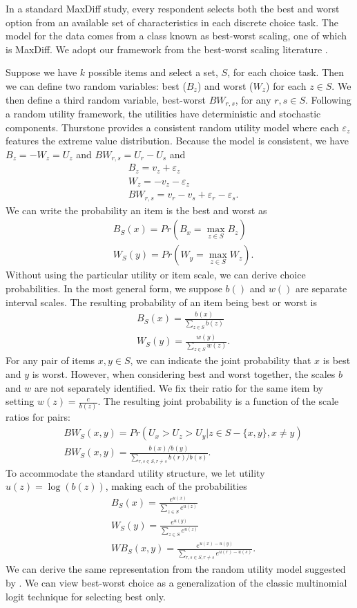 \documentclass[a4paper,11pt]{article}
\begin{document}
In a standard MaxDiff study, every respondent selects both the best and worst option from an available set of characteristics in each discrete choice task. The model for the data comes from a class known as best-worst scaling, one of which is MaxDiff. We adopt our framework from the best-worst scaling literature \citep{marley2005some,marley2012models}. 

Suppose we have $k$ possible items and select a set, $S$, for each choice task. Then we can define two random variables: best ($B_z$) and worst ($W_z$) for each $z \in S$.  We then define a third random variable, best-worst $BW_{r,s}$, for any $r,s \in S$. Following a random utility framework, the utilities have deterministic and stochastic components. Thurstone provides a consistent random utility model where each $\varepsilon_z$ features the extreme value distribution. Because the model is consistent, we have $B_z=-W_z=U_z$ and $BW_{r,s}=U_r-U_s$ and
\begin{align*}
&B_z=v_z+\varepsilon_z\\
&W_z=-v_z-\varepsilon_z\\
&BW_{r,s}=v_r-v_s+\varepsilon_r-\varepsilon_s.
\end{align*}We can write the probability an item is the best and worst as
\begin{align*}
&B_S (x)= Pr⁡( B_x=\max_{z \in S} B_z)\\
&W_S (y)= Pr⁡( W_y=\max_{z \in S} W_z).
\end{align*}
Without using the particular utility or item scale, we can derive choice probabilities. In the most general form, we suppose $b()$ and $w()$ are separate interval scales. The resulting probability of an item being best or worst is
\begin{align*}
&B_S (x)= \frac{b(x)}{\sum_{z \in S}b(z)}\\
&W_S (y)= \frac{w(y)}{\sum_{z \in S}w(z)}.
\end{align*}
For any pair of items $x,y \in S$, we can indicate the joint probability that $x$ is best and $y$ is worst. However, when considering best and worst together, the scales $b$ and $w$ are not separately identified. We fix their ratio for the same item by setting $w(z)=\frac{c}{b(z)}$. The resulting joint probability is a function of the scale ratios for pairs: 
\begin{align*}
&BW_S(x,y)=Pr(U_x>U_z>U_y | z \in S -\{x,y\}, x\neq y)\\
&BW_S(x,y)=\frac{b(x)/b(y)}{\sum_{r,s \in S, r \neq s}b(r)/b(s)}.
\end{align*}
To accommodate the standard utility structure, we let utility $u(z)=\log{(b(z))}$, making each of the probabilities 
\begin{align*}
&B_S(x)=\frac{e^{u(x)}}{\sum_{z \in S} e^{u(z)}}\\
&W_S(y)=\frac{e^{u(y)}}{\sum_{z \in S} e^{u(z)}}\\
&WB_S(x,y)=\frac{e^{u(x)-u(y)}}{\sum_{r,s \in S, r\neq s} e^{u(r)-u(s)}}.
\end{align*}
We can derive the same representation from the random utility model suggested by \cite{marley2005some}. We can view best-worst choice as a generalization of the classic multinomial logit technique for selecting best only.
\end{document}
